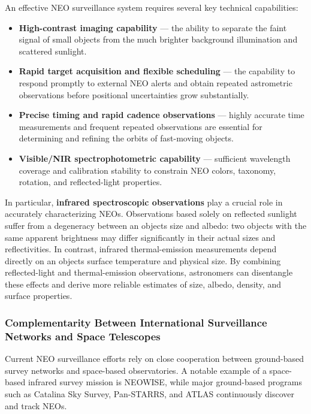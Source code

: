 An effective NEO surveillance system requires several key technical capabilities:

\begin{itemize}
\item
  \textbf{High-contrast imaging capability} --- the ability to separate the faint signal of small objects from the much brighter background illumination and scattered sunlight.
\item
  \textbf{Rapid target acquisition and flexible scheduling} --- the capability to respond promptly to external NEO alerts and obtain repeated astrometric observations before positional uncertainties grow substantially.
\item
  \textbf{Precise timing and rapid cadence observations} --- highly accurate time measurements and frequent repeated observations are essential for determining and refining the orbits of fast-moving objects.
\item
  \textbf{Visible/NIR spectrophotometric capability} --- sufficient wavelength coverage and calibration stability to constrain NEO colors, taxonomy, rotation, and reflected-light properties. 
\end{itemize}

In particular, \textbf{infrared spectroscopic observations} play a crucial role in accurately characterizing NEOs. Observations based solely on reflected sunlight suffer from a degeneracy between an object\textquotesingle s size and albedo: two objects with the same apparent brightness may differ significantly in their actual sizes and reflectivities. In contrast, infrared thermal-emission measurements depend directly on an object\textquotesingle s surface temperature and physical size. By combining reflected-light and thermal-emission observations, astronomers can disentangle these effects and derive more reliable estimates of size, albedo, density, and surface properties.

\subsubsection{Complementarity Between International Surveillance Networks and Space Telescopes}

Current NEO surveillance efforts rely on close cooperation between ground-based survey networks and space-based observatories. A notable example of a space-based infrared survey mission is NEOWISE, while major ground-based programs such as Catalina Sky Survey, Pan-STARRS, and ATLAS continuously discover and track NEOs.

